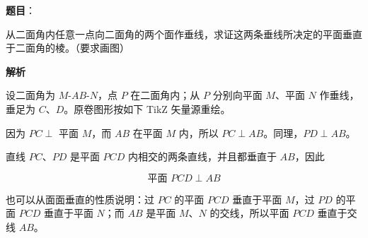 \begin{answer}

\textbf{题目}：

从二面角内任意一点向二面角的两个面作垂线，求证这两条垂线所决定的平面垂直于二面角的棱。（要求画图）

\textbf{解析}

设二面角为 $M\text{-}AB\text{-}N$，点 $P$ 在二面角内；从 $P$ 分别向平面 $M$、平面 $N$ 作垂线，垂足为 $C$、$D$。原卷图形按如下 TikZ 矢量源重绘。
\nopagebreak[4]
\begin{center}\end{center}
\nopagebreak[4]
因为 $PC\perp$ 平面 $M$，而 $AB$ 在平面 $M$ 内，所以 $PC\perp AB$。同理，$PD\perp AB$。

直线 $PC$、$PD$ 是平面 $PCD$ 内相交的两条直线，并且都垂直于 $AB$，因此

\nopagebreak[4]
\[
\text{平面 }PCD\perp AB
\]

也可以从面面垂直的性质说明：过 $PC$ 的平面 $PCD$ 垂直于平面 $M$，过 $PD$ 的平面 $PCD$ 垂直于平面 $N$；而 $AB$ 是平面 $M$、$N$ 的交线，所以平面 $PCD$ 垂直于交线 $AB$。


\end{answer}
